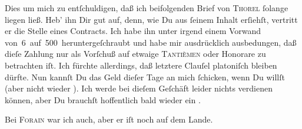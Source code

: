 \pstart
           Dies um mich zu entſchuldigen, daß ich  beifolgenden
               Brief von \textsc{Thorel} ſolange liegen ließ. Heb’ ihn Dir gut auf, denn, wie Du aus ſeinem Inhalt
               erſiehſt, vertritt er die Stelle eines Contracts. Ich habe ihn unter irgend einem
               Vorwand von 6 auf 500 heruntergeſchraubt und habe mir ausdrücklich ausbedungen, daß
               dieſe Zahlung nur als Vorſchuß auf etwaige {\pb}\strikeout{\textcolor{gray}{×}}{ }\textsc{Tantièmen} oder Honorare zu betrachten iſt. Ich fürchte
               allerdings, daß letztere Clauſel platoniſch bleiben dürfte. Nun kannſt Du das Geld
               dieſer Tage an mich ſchicken, wenn Du willſt (aber nicht wieder \label{K_L02785-2v}\label{K_L02785-2}). Ich werde
               bei dieſem Geſchäft leider nichts verdienen können, aber Du brauchſt hoffentlich bald
               wieder ein \label{K_L02785-3v}\label{K_L02785-3}.\pend
           
\pstart
           Bei \textsc{Forain} war ich auch, aber er iſt noch auf {\pb}dem
               Lande.\pend
           
